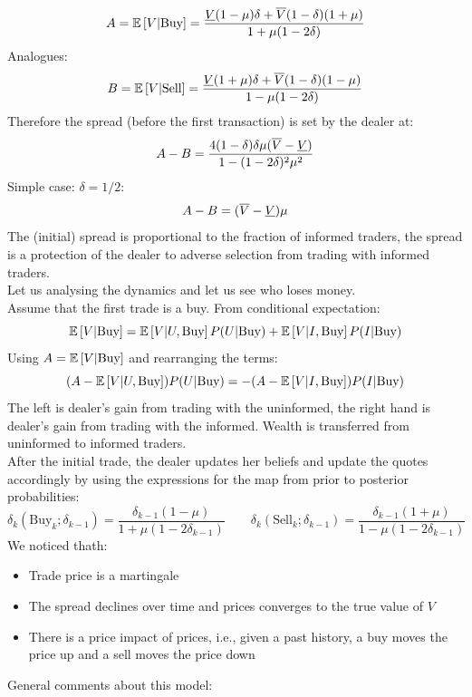 \[
A = \mathbb{E}\left[V| \text{Buy}\right] = \frac{\text{\underline{$V$}} (1- \mu) \delta + \overline{V}(1 - \delta) (1 + \mu)}{1 + \mu(1- 2 \delta)}
\]
Analogues:
\[
B = \mathbb{E}\left[V| \text{Sell}\right] = \frac{\text{\underline{$V$}} (1+ \mu) \delta + \overline{V}(1 - \delta) (1 - \mu)}{1 - \mu(1- 2 \delta)}
\]
Therefore the spread (before the first transaction) is set by the dealer at:
\[
A- B = \frac{4(1-\delta)\delta \mu (\overline{V} - \text{\underline{$V$}})}{1 - (1-2\delta)^2\mu^2}
\]
Simple case: $\delta = 1/2$:
\[
A-B = (\overline{V} - \text{\underline{$V$}})\mu
\]
The (initial) spread is proportional to the fraction of informed traders, the spread is a protection of the dealer to adverse selection from trading with informed traders.\medskip\\
Let us analysing the dynamics and let us see who loses money.\\
Assume that the first trade is a buy. From conditional expectation:
\[
\mathbb{E}\left[V|\text{Buy}\right] = \mathbb{E}\left[V|U,\text{Buy}\right]P(U|\text{Buy}) + \mathbb{E}\left[V|I,\text{Buy}\right]P(I|\text{Buy})
\]
Using $A = \mathbb{E}\left[V| \text{Buy}\right]$ and rearranging the terms:
\[
(A - \mathbb{E}\left[V | U, \text{Buy}\right]) P (U|\text{Buy}) = - (A - \mathbb{E}\left[V|I, \text{Buy}\right])P(I|\text{Buy})
\]
The left is dealer's gain from trading with the uninformed, the right hand is dealer's gain from trading with the informed. Wealth is transferred from uninformed to informed traders.\\
After the initial trade, the dealer updates her beliefs and update the quotes accordingly by using the expressions for the map from prior to posterior probabilities:
\[
\delta_k(\text{Buy}_k; \delta_{k-1}) = \frac{\delta_{k-1}(1 - \mu)}{1 + \mu(1-2\delta_{k-1})} \qquad \delta_k(\text{Sell}_k; \delta_{k-1}) = \frac{\delta_{k-1}(1 + \mu)}{1 - \mu(1-2\delta_{k-1})}
\]
We noticed thath:
\begin{itemize}
	\item Trade price is a martingale
	\item The spread declines over time and prices converges to the true value of $V$
	\item There is a price impact of prices, i.e., given a past history, a buy moves the price up and a sell moves the price down
\end{itemize}
\newpage
General comments about this model:

